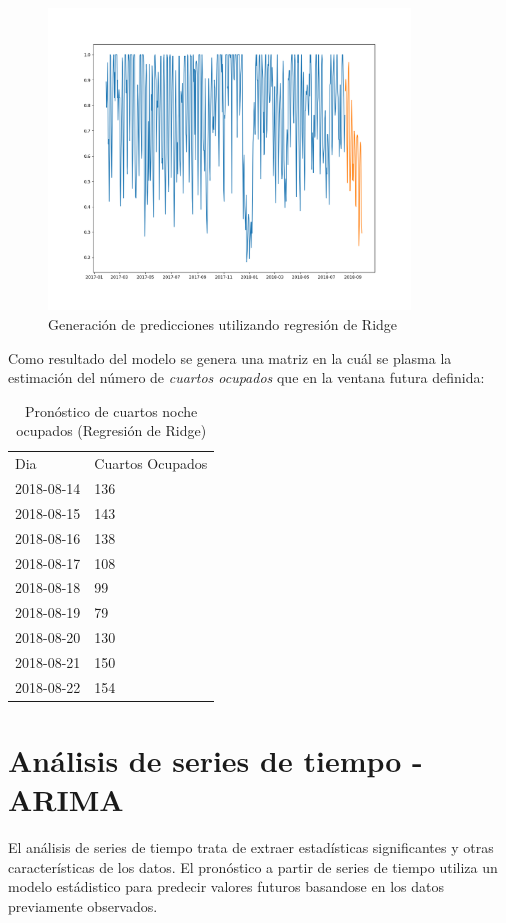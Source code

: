 \begin{figure}[H]
  \centering
      \includegraphics[width=\maxwidth,height=8cm]{figures/RidgePronostico.png}    
  \caption{Generación de predicciones utilizando regresión de Ridge}
\end{figure}


Como resultado del modelo se genera una matriz en la cuál se plasma la estimación del número de \emph{cuartos ocupados} que en la ventana futura definida:

\begin{table}[H]
\centering
\begin{tabular}{ll}
Dia        & Cuartos Ocupados \\
2018-08-14 & 136              \\
2018-08-15 & 143              \\
2018-08-16 & 138              \\
2018-08-17 & 108              \\
2018-08-18 & 99               \\
2018-08-19 & 79               \\
2018-08-20 & 130              \\
2018-08-21 & 150              \\
2018-08-22 & 154              
\end{tabular}
\caption{Pronóstico de cuartos noche ocupados (Regresión de Ridge)} 
\end{table}

\section*{Análisis de series de tiempo - ARIMA}

El análisis de series de tiempo trata de extraer estadísticas significantes y otras características de los datos. El pronóstico a partir de series de tiempo utiliza un modelo estádistico para predecir valores futuros basandose en los datos previamente observados.

